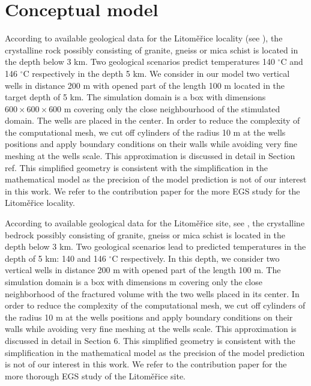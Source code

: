 \documentclass{article}
\newcommand{\todo}[1]{{\color{red}#1}}
\newcommand{\degC}{$^\circ\mathrm{C}$}
\begin{document}
\section{Conceptual model}
According to available geological data for the Litoměřice locality (see \cite{Capova2013}), the crystalline rock possibly consisting of granite, gneiss or mica schist 
is located in the depth
below 3 km. Two geological scenarios predict temperatures 140 \degC{}  and 146 \degC{} respectively in the depth 5 km. We consider in our model two vertical wells in distance 200 m with opened part of the length 100 m located in the target depth of 5 km. The simulation domain is a box with dimensions $600\times600\times600$ m covering only the close neighbourhood of the stimulated domain. The wells are placed in the center. In order to reduce the complexity of the computational mesh, we
cut off cylinders of the radius 10 m at the wells positions and apply boundary conditions on their walls while avoiding very fine meshing at the wells scale.
This approximation is discussed in detail in Section \todo{ref}. %
This simplified geometry is consistent with the simplification in the mathematical model as the precision of the model prediction is not of our interest in this work. We refer to the contribution paper \cite{Ralek} for the more EGS study for the Litoměřice locality.

According to available geological data for the Litom{\v e}{\v r}ice site, see \cite{Capova2013}, the crystalline bedrock possibly consisting of granite, gneiss or mica schist is located in the depth below 3 km. Two geological scenarios lead to predicted temperatures in the depth of 5 km: 140 and 146 \degC{} respectively. In this depth, we consider two vertical wells in distance 200 m with opened part of the length 100 m. The simulation domain is a box with dimensions   m covering only the close neighborhood of the fractured volume with the two wells placed in its center. In order to reduce the complexity of the computational mesh, we cut off cylinders of the radius 10 m at the wells positions and apply boundary conditions on their walls while avoiding very fine meshing at the wells scale. This approximation is discussed in detail in Section 6. This simplified geometry is consistent with the simplification in the mathematical model as the precision of the model prediction is not of our interest in this work. We refer to the contribution paper \cite{Ralek} for the more thorough EGS study of the Litoměřice site.
\end{document}
